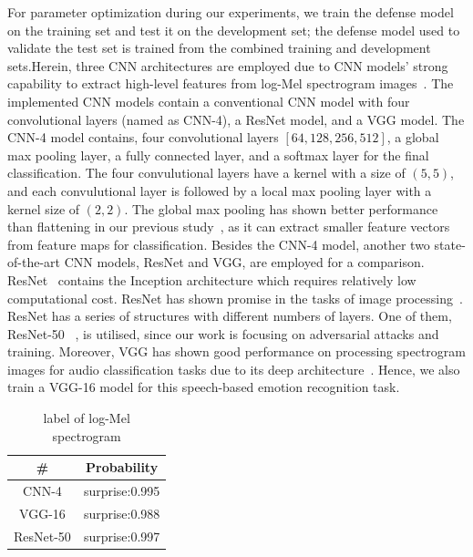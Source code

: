 For parameter optimization during our experiments, we train the defense model on the training set and test it on the development set; the defense model used to validate the test set is trained from the combined training and development sets.Herein, three CNN architectures are employed due to CNN models' strong capability to extract high-level features from log-Mel spectrogram images~\cite{zhao2018data}. The implemented CNN models contain a conventional CNN model with four convolutional layers (named as CNN-4), a ResNet model, and a VGG model.
The CNN-4 model contains, four convolutional layers $[64,128,256,512]$, a global max pooling layer, a fully connected layer, and a softmax layer for the final classification. The four convulutional layers have a kernel with a size of $(5, 5)$, and each convulutional layer is followed by a local max pooling layer with a kernel size of $(2, 2)$. The global max pooling has shown better performance than flattening in our previous study~\cite{ren2018attention}, as it can extract smaller feature vectors from feature maps for classification.
Besides the CNN-4 model, another two state-of-the-art CNN models, ResNet and VGG, are employed for a comparison. ResNet~\cite{szegedy2017inception} contains the Inception architecture which requires relatively low computational cost. ResNet has shown promise in the tasks of image processing~\cite{szegedy2017inception}. ResNet has a series of structures with different numbers of layers. One of them, ResNet-50 ~\cite{he2016deep}, is utilised, since our work is focusing on adversarial attacks and training. Moreover, VGG has shown good performance on processing spectrogram images for audio classification tasks due to its deep architecture~\cite{simonyan2015very,ren2018learning}. Hence, we also train a VGG-16 model for this speech-based emotion recognition task.

\begin{table}[]
	\centering
	\begin{tabular}{c|c}
		\hline
		\#        & Probability    \\ \hline
		CNN-4     & surprise:0.995 \\ \hline
		VGG-16    & surprise:0.988 \\
		ResNet-50 & surprise:0.997
	\end{tabular}
	\caption[label of log-Mel spectrogram]{label of log-Mel spectrogram}
\end{table}

